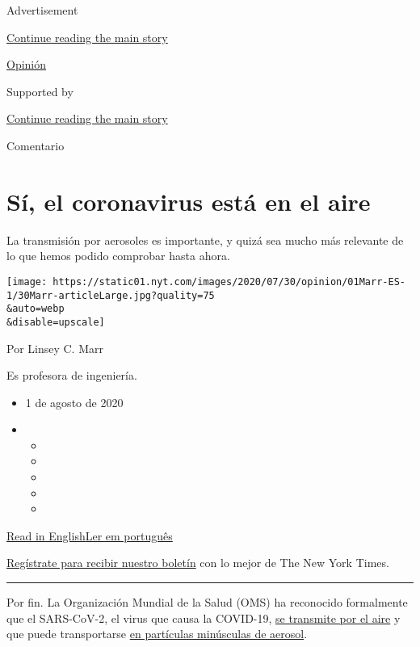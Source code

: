Advertisement

\protect\hyperlink{after-top}{Continue reading the main story}

\href{/es/section/opinion}{Opinión}

Supported by

\protect\hyperlink{after-sponsor}{Continue reading the main story}

Comentario

\hypertarget{suxed-el-coronavirus-estuxe1-en-el-aire}{%
\section{Sí, el coronavirus está en el
aire}\label{suxed-el-coronavirus-estuxe1-en-el-aire}}

La transmisión por aerosoles es importante, y quizá sea mucho más
relevante de lo que hemos podido comprobar hasta ahora.

\texttt{[image: https://static01.nyt.com/images/2020/07/30/opinion/01Marr-ES-1/30Marr-articleLarge.jpg?quality=75\\\&auto=webp\\\&disable=upscale]}

Por Linsey C. Marr

Es profesora de ingeniería.

\begin{itemize}
\item
  1 de agosto de 2020
\item
  \begin{itemize}
  \item
  \item
  \item
  \item
  \item
  \end{itemize}
\end{itemize}

\href{https://www.nytimes.com/2020/07/30/opinion/coronavirus-aerosols.html}{Read
in
English}\href{https://www.nytimes.com/pt/2020/08/05/opinion/international-world/coronavirus-esta-no-ar.html}{Ler
em português}

\href{https://www.nytimes.com/newsletters/el-times}{Regístrate para
recibir nuestro boletín} con lo mejor de The New York Times.

\begin{center}\rule{0.5\linewidth}{\linethickness}\end{center}

Por fin. La Organización Mundial de la Salud (OMS) ha reconocido
formalmente que el SARS-CoV-2, el virus que causa la COVID-19,
\href{https://www.nytimes.com/2020/07/09/health/virus-aerosols-who.html}{se
transmite por el aire} y que puede transportarse
\href{https://www.nature.com/articles/d41586-020-02058-1}{en partículas
minúsculas de aerosol}.

